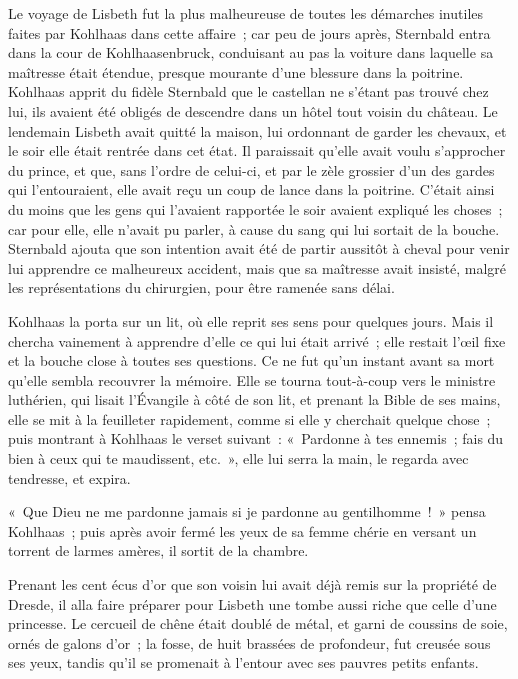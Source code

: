 \documentclass[french,twoside]{book} %
\newcommand\chaptercont{} %
\begin{document}
\chaptercont
\noindent Le voyage de Lisbeth fut la plus malheureuse de toutes les démarches inutiles faites par Kohlhaas dans cette affaire ; car peu de jours après, Sternbald entra dans la cour de Kohlhaasenbruck, conduisant au pas la voiture dans laquelle sa maîtresse était étendue, presque mourante d’une blessure dans la poitrine. Kohlhaas apprit du fidèle Sternbald que le castellan ne s’étant pas trouvé chez lui, ils avaient été obligés de descendre dans un hôtel tout voisin du château. Le lendemain Lisbeth avait quitté la maison, lui ordonnant de garder les chevaux, et le soir elle était rentrée dans cet état. Il paraissait qu’elle avait voulu s’approcher du prince, et que, sans l’ordre de celui-ci, et par le zèle grossier d’un des gardes qui l’entouraient, elle avait reçu un coup de lance dans la poitrine. C’était ainsi du moins que les gens qui l’avaient rapportée le soir avaient expliqué les choses ; car pour elle, elle n’avait pu parler, à cause du sang qui lui sortait de la bouche. Sternbald ajouta que son intention avait été de partir aussitôt à cheval pour venir lui apprendre ce malheureux accident, mais que sa maîtresse avait insisté, malgré les représentations du chirurgien, pour être ramenée sans délai.\par
Kohlhaas la porta sur un lit, où elle reprit ses sens pour quelques jours. Mais il chercha vainement à apprendre d’elle ce qui lui était arrivé ; elle restait l’œil fixe et la bouche close à toutes ses questions. Ce ne fut qu’un instant avant sa mort qu’elle sembla recouvrer la mémoire. Elle se tourna tout-à-coup vers le ministre luthérien, qui lisait l’Évangile à côté de son lit, et prenant la Bible de ses mains, elle se mit à la feuilleter rapidement, comme si elle y cherchait quelque chose ; puis montrant à Kohlhaas le verset suivant : « Pardonne à tes ennemis ; fais du bien à ceux qui te maudissent, etc. », elle lui serra la main, le regarda avec tendresse, et expira.\par
« Que Dieu ne me pardonne jamais si je pardonne au gentilhomme ! » pensa Kohlhaas ; puis après avoir fermé les yeux de sa femme chérie en versant un torrent de larmes amères, il sortit de la chambre.\par
Prenant les cent écus d’or que son voisin lui avait déjà remis sur la propriété de Dresde, il alla faire préparer pour Lisbeth une tombe aussi riche que celle d’une princesse. Le cercueil de chêne était doublé de métal, et garni de coussins de soie, ornés de galons d’or ; la fosse, de huit brassées de profondeur, fut creusée sous ses yeux, tandis qu’il se promenait à l’entour avec ses pauvres petits enfants.\par
\end{document}
